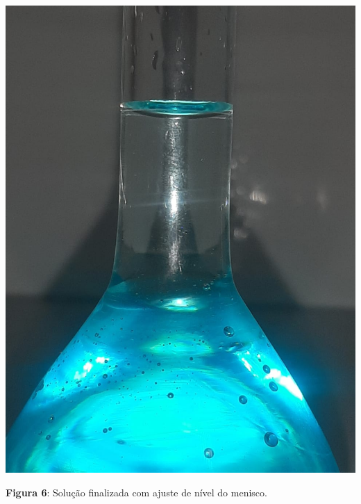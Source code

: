 \documentclass[a4paper, 11pt]{article}
\begin{document}
        \begin{center}
            \parbox{7cm}{\includegraphics[scale=0.2]{06. solucao_finalizada.jpeg}}
            \singlespacing
            \textbf{Figura 6}: Solução finalizada com ajuste de nível do menisco\@.
        \end{center}
        \doublespacing
\end{document}
